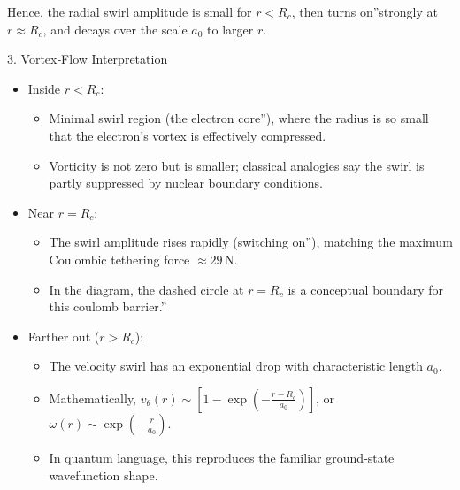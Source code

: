 \documentclass[a4paper,10pt]{article}
\begin{document}
Hence, the radial swirl amplitude is small for \(r < R_c\), then \grqq turns on\textquotedblright strongly at \(r \approx R_c\), and decays over the scale \(a_0\) to larger \(r\).

3. Vortex‐Flow Interpretation

\begin{itemize}
    \item Inside \(r < R_c\):

        \begin{itemize}
            \item Minimal swirl region (the \grqq electron core\textquotedblright), where the radius is so small that the electron's vortex is effectively compressed.

            \item Vorticity is not zero but is smaller; classical analogies say the swirl is partly suppressed by nuclear boundary conditions.
        \end{itemize}

    \item Near \(r = R_c\):

        \begin{itemize}
            \item The swirl amplitude rises rapidly (\grqq switching on\textquotedblright), matching the maximum Coulombic tethering force \(\approx 29\,\mathrm{N}\).

            \item In the diagram, the dashed circle at \(r = R_c\) is a conceptual boundary for this \grqq coulomb barrier.\textquotedblright
        \end{itemize}

    \item Farther out (\(r > R_c\)):

    \begin{itemize}
        \item The velocity swirl has an exponential drop with characteristic length \(a_0\).

        \item Mathematically, \(v_\theta(r) \sim [1 - \exp(-\frac{r - R_c}{a_0})]\), or \(\omega(r) \sim \exp(-\frac{r}{a_0})\).

        \item In quantum language, this reproduces the familiar ground‐state wavefunction shape.
    \end{itemize}
\end{itemize}
\end{document}
